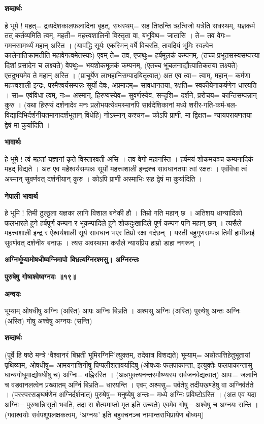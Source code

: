 \documentclass[11pt, a5paper]{article}
\begin{document}
\textbf{शब्दार्थः}

हे भूमे ! महत्= द्रव्यदेशकालफलादिना बृहत्, सधस्थम्= सह तिष्ठन्ति ऋत्विजो यत्रेति सधस्थम्, यज्ञकर्म तत् कर्तव्यमिति त्वम्, महती= महत्त्वशालिनी विस्तृता वा, बभूविथ= जातासि । ते= तव वेगः= गमनसामर्थ्यं महान् अस्ति । (यावद्धि सूर्यः एकस्मिन् वर्षेे विचरति, तावदियं भूमिः स्वल्पेन कालेनातिक्रामतीति महावेगत्वमेतस्याः) एवम्  ते= तव, एजथुः= हर्षमूलकं कम्पनम्, (तच्च प्रभूतसस्यसम्पत्त्या दिशां प्रसादेन च लक्ष्यते) वेपथुः= भयशोकमूलकं कम्पनम्, (एतच्च भूचलनाद्यौत्पातिकतया लक्ष्यते) एतदुभयमेव ते महान् अस्ति । (प्राचूर्येण  लाभहानिसम्पादयितृत्वात्) अत एव त्वा= त्वाम्, महान्= कर्मणा महत्त्वशाली इन्द्रः, परमैश्वर्यसम्पन्नः सूर्यो देवः, अप्रमादम्= सावधानतया, रक्षति= स्वकीयेनाकर्षणेन धारयति । सा= एवंविधा त्वम्, नः= अस्मान्, हिरण्यस्येव= सुवर्णस्येव, सन्दृशि= दर्शने, प्ररोचय= कान्तिसम्पन्नान् कुरु । (यथा हिरण्यं दर्शनादेव मनः प्रलोभयत्येवमस्मानपि सार्वदेशिकानां मध्ये शरीर-गति-कर्म-बल-विद्यादिभिर्दर्शनीयतमानादर्शभूतान् विधेहि) नोऽस्मान् कश्चन= कोऽपि प्राणी, मा द्विक्षत= न्यायपरायणतया द्वेषं मा कुर्यादिति ।

\textbf{भावार्थः}

हे भूमे ! त्वं महतां यज्ञानां कृते विस्तारवती असि । तव वेगो महानस्ति । हर्षमयं शोकमयञ्च कम्पनादिकं महद् विद्यते । अत एव महैश्वर्यसम्पन्नः सूर्यो महत्त्वशाली इन्द्रश्च सावधानतया त्वां रक्षतः । एवंविधा त्वं अस्मान् सुवर्णवत् दर्शनीयान् कुरु । कोऽपि प्राणी अस्माभिः सह द्वेषं मा कुर्यादिति ।

\textbf{नेपाली भावार्थ}

हे भूमि ! तिमी ठुल्ठुला यज्ञका लागि विशाल बनेकी हौ । तिम्रो गति महान् छ । अतिशय धान्यादिको फलभारले हुने हर्षपूर्ण कम्पन र भूकम्पादिले हुने शोकदुःखादिले पूर्ण कम्पन पनि महान् छन् । त्यसैले महत्त्वशाली इन्द्र र ऐश्वर्यशाली सूर्य सावधान भएर तिम्रो रक्षा गर्दछन् । यस्ती बहुगुणसम्पन्न तिमी हामीलाई सुवर्णवत् दर्शनीय बनाऊ । त्यस अवस्थामा कसैले न्यायप्रिय हाम्रो डाहा नगरून् ।

\textbf{अग्निर्भूम्यामोषधीष्वग्निमापो बिभ्रत्यग्निरश्मसु। अग्निरन्तः}

\textbf{पुरुषेषु गोष्वश्वेष्वग्नयः ॥१९॥}

\textbf{अन्वयः}

भूम्याम् ओषधीषु अग्निः (अस्ति) आपः अग्निः बिभ्रति । अश्मसु अग्निः (अस्ति) पुरुषेषु अन्तः अग्निः (अस्ति) गोषु अश्वेषु अग्नयः (सन्ति)

\textbf{शब्दार्थः}

(पूर्वे हि षष्ठे मन्त्रे ‘वैश्वानरं बिभ्रती भूमिरग्निमि’त्युक्तम्, तदेवात्र विशद्यते) भूम्याम्= अन्नोत्पत्तिहेतुभूतायां पृथिव्याम्, ओषधीषु= आमयनाशिनीषु पिप्पलीशतावर्यादिषु (ओषध्यः फलपाकान्ता, इत्युक्तेः फलपाकान्तासु धान्यगोधूमाद्योषधीषु च) अग्निः= वह्निरस्ति । (अन्नभुक्त्यनन्तरमौष्ण्यस्य सर्वजनवेद्यत्वात्) आपः= जलानि च वडवानलत्वेन प्रख्यातम् अग्निं बिभ्रति= धारयन्ति । एवम् अश्मसु= पर्वतेषु तदीयखण्डेषु वा अग्निर्वर्तते । (परस्परसङ्‍घर्षणेन अग्निर्दर्शनात्) पुरुषेषु= मनुष्येषु अन्तः= मध्ये अग्निः प्रविष्टोऽस्ति । (अत एव यदा अग्निः= पुरुषान्निःसृतो भवति, तदा स शैत्यमाप्तो मृत इति उच्यते) एवमेव गोषु= अश्वेषु च अग्नयः सन्ति । (गवाश्वयोः सर्वपशूपलक्षकत्वम्, ‘अग्नयः’ इति बहुवचनञ्च नामान्तराभिप्रायेण बोध्यम्)
\end{document}

